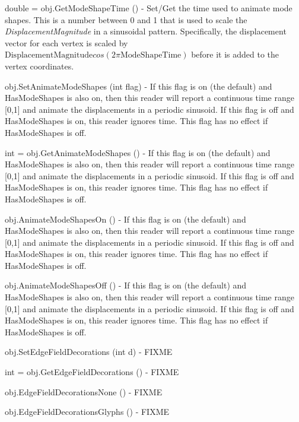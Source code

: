 \begin{DoxyItemize}
\item {\ttfamily double = obj.\-Get\-Mode\-Shape\-Time ()} -\/ Set/\-Get the time used to animate mode shapes. This is a number between 0 and 1 that is used to scale the {\itshape Displacement\-Magnitude} in a sinusoidal pattern. Specifically, the displacement vector for each vertex is scaled by $ \mathrm{DisplacementMagnitude} cos( 2\pi \mathrm{ModeShapeTime} ) $ before it is added to the vertex coordinates.  
\item {\ttfamily obj.\-Set\-Animate\-Mode\-Shapes (int flag)} -\/ If this flag is on (the default) and Has\-Mode\-Shapes is also on, then this reader will report a continuous time range \mbox{[}0,1\mbox{]} and animate the displacements in a periodic sinusoid. If this flag is off and Has\-Mode\-Shapes is on, this reader ignores time. This flag has no effect if Has\-Mode\-Shapes is off.  
\item {\ttfamily int = obj.\-Get\-Animate\-Mode\-Shapes ()} -\/ If this flag is on (the default) and Has\-Mode\-Shapes is also on, then this reader will report a continuous time range \mbox{[}0,1\mbox{]} and animate the displacements in a periodic sinusoid. If this flag is off and Has\-Mode\-Shapes is on, this reader ignores time. This flag has no effect if Has\-Mode\-Shapes is off.  
\item {\ttfamily obj.\-Animate\-Mode\-Shapes\-On ()} -\/ If this flag is on (the default) and Has\-Mode\-Shapes is also on, then this reader will report a continuous time range \mbox{[}0,1\mbox{]} and animate the displacements in a periodic sinusoid. If this flag is off and Has\-Mode\-Shapes is on, this reader ignores time. This flag has no effect if Has\-Mode\-Shapes is off.  
\item {\ttfamily obj.\-Animate\-Mode\-Shapes\-Off ()} -\/ If this flag is on (the default) and Has\-Mode\-Shapes is also on, then this reader will report a continuous time range \mbox{[}0,1\mbox{]} and animate the displacements in a periodic sinusoid. If this flag is off and Has\-Mode\-Shapes is on, this reader ignores time. This flag has no effect if Has\-Mode\-Shapes is off.  
\item {\ttfamily obj.\-Set\-Edge\-Field\-Decorations (int d)} -\/ F\-I\-X\-M\-E  
\item {\ttfamily int = obj.\-Get\-Edge\-Field\-Decorations ()} -\/ F\-I\-X\-M\-E  
\item {\ttfamily obj.\-Edge\-Field\-Decorations\-None ()} -\/ F\-I\-X\-M\-E  
\item {\ttfamily obj.\-Edge\-Field\-Decorations\-Glyphs ()} -\/ F\-I\-X\-M\-E  

\end{DoxyItemize}
